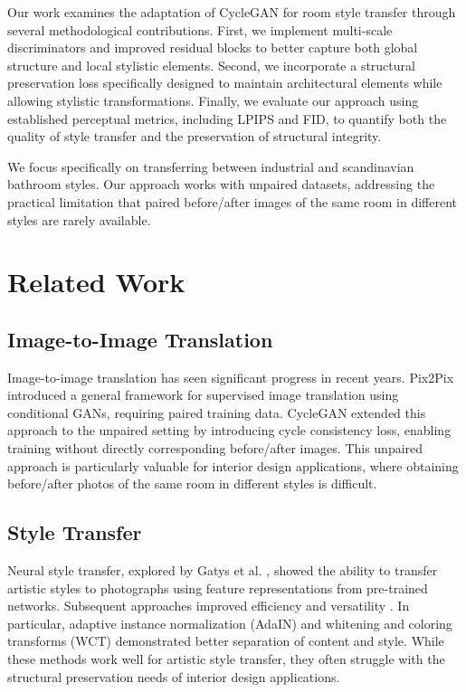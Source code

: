 \documentclass[twocolumn,superscriptaddress,aps]{revtex4-1}
\begin{document}
Our work examines the adaptation of CycleGAN for room style transfer through several methodological contributions. First, we implement multi-scale discriminators and improved residual blocks to better capture both global structure and local stylistic elements. Second, we incorporate a structural preservation loss specifically designed to maintain architectural elements while allowing stylistic transformations. Finally, we evaluate our approach using established perceptual metrics, including LPIPS and FID, to quantify both the quality of style transfer and the preservation of structural integrity.

We focus specifically on transferring between industrial and scandinavian bathroom styles. Our approach works with unpaired datasets, addressing the practical limitation that paired before/after images of the same room in different styles are rarely available.

\section{Related Work}

\subsection{Image-to-Image Translation}
Image-to-image translation has seen significant progress in recent years. Pix2Pix \cite{isola2017image} introduced a general framework for supervised image translation using conditional GANs, requiring paired training data. CycleGAN \cite{zhu2017unpaired} extended this approach to the unpaired setting by introducing cycle consistency loss, enabling training without directly corresponding before/after images. This unpaired approach is particularly valuable for interior design applications, where obtaining before/after photos of the same room in different styles is difficult.

\subsection{Style Transfer}
Neural style transfer, explored by Gatys et al. \cite{gatys2016image}, showed the ability to transfer artistic styles to photographs using feature representations from pre-trained networks. Subsequent approaches improved efficiency \cite{johnson2016perceptual} and versatility \cite{huang2017arbitrary}. In particular, adaptive instance normalization (AdaIN) \cite{huang2017arbitrary} and whitening and coloring transforms (WCT) \cite{li2017universal} demonstrated better separation of content and style. While these methods work well for artistic style transfer, they often struggle with the structural preservation needs of interior design applications.
\end{document}
